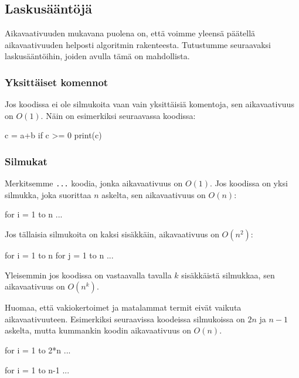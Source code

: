 \subsection{Laskusääntöjä}

Aikavaativuuden mukavana puolena on, että voimme yleensä
päätellä aikavaativuuden helposti algoritmin
rakenteesta. Tutustumme seuraavaksi laskusääntöihin,
joiden avulla tämä on mahdollista.

\subsubsection{Yksittäiset komennot}

Jos koodissa ei ole silmukoita vaan vain
yksittäisiä komentoja, sen aikavaativuus on $O(1)$.
Näin on esimerkiksi seuraavassa koodissa:

\begin{code}
c = a+b
if c >= 0
    print(c)
\end{code}

\subsubsection{Silmukat}

Merkitsemme \texttt{...} koodia,
jonka aikavaativuus on $O(1)$.
Jos koodissa on yksi silmukka,
joka suorittaa $n$ askelta,
sen aikavaativuus on $O(n)$:

\begin{code}
for i = 1 to n
    ...
\end{code}

Jos tällaisia silmukoita on kaksi sisäkkäin,
aikavaativuus on $O(n^2)$:

\begin{code}
for i = 1 to n
    for j = 1 to n
        ...
\end{code}

Yleisemmin jos koodissa on vastaavalla tavalla
$k$ sisäkkäistä silmukkaa, sen aikavaativuus on $O(n^k)$.


Huomaa, että vakiokertoimet ja matalammat termit eivät vaikuta aikavaativuuteen.
Esimerkiksi seuraavissa koodeissa silmukoissa on $2n$ ja $n-1$ askelta,
mutta kummankin koodin aikavaativuus on $O(n)$.

\begin{code}
for i = 1 to 2*n
    ...
\end{code}

\begin{code}
for i = 1 to n-1
    ...
\end{code}

